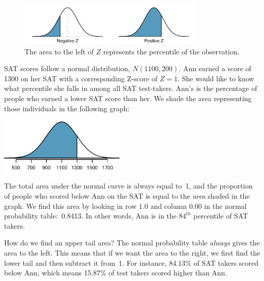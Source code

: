 \begin{figure}[h]
  \centering
  \includegraphics[width=0.8\textwidth]
      {ch_distributions/figures/normalTails/normalTails}
  \caption{The area to the left of $Z$ represents the
      percentile of the observation.}
\end{figure}

\begin{examplewrap}
\begin{nexample}{
    SAT scores follow a normal distribution, $N(1100, 200)$.
    Ann earned a score of 1300 on her SAT with
    a corresponding Z-score of $Z = 1$.
    She would like to know what percentile she falls in among
    all SAT test-takers.}
  Ann's  is the percentage of people who
  earned a lower SAT score than her.
  We shade the area representing those individuals in the
  following graph:
  \begin{center}
  \includegraphics[width=0.45\textwidth]
      {ch_distributions/figures/satBelow1300/satBelow1300}
  \end{center}
  The total area under the normal curve is always equal to~1,
  and the proportion of people who scored below Ann on the SAT
  is equal to the \emph{area} shaded in the graph.
  We find this area by looking in row $1.0$ and column $0.00$
  in the normal probability table:~0.8413.
  In other words, Ann is in the $84^{th}$ percentile of
  SAT takers.
\end{nexample}
\end{examplewrap}

\begin{examplewrap}
\begin{nexample}{How do we find an upper tail area?}
  The normal probability table \emph{always} gives the area
  to the left.
  This means that if we want the area to the right,
  we first find the lower tail and then subtract it from~1.
  For instance, 84.13\% of SAT takers scored below Ann,
  which means 15.87\% of test takers scored higher than Ann.
\end{nexample}
\end{examplewrap}

